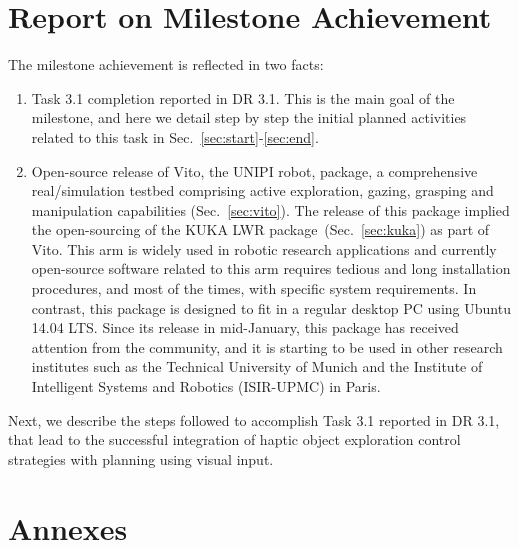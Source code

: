 \documentclass[a4paper,11pt,pdf]{pacmanreport}
\begin{document}
\section{Report on Milestone Achievement}

The milestone achievement is reflected in two facts:
\begin{enumerate}
	\item Task 3.1 completion reported in DR 3.1. This is the main goal of the milestone, and here we detail step by step the initial planned activities related to this task in Sec.~\ref{sec:start}-\ref{sec:end}.

	\item Open-source release of Vito, the UNIPI robot, package, a comprehensive real/simulation testbed comprising active exploration, gazing, grasping and manipulation capabilities (Sec.~\ref{sec:vito}). The release of this package implied the open-sourcing of the KUKA LWR package~(Sec.~\ref{sec:kuka}) as part of Vito. This arm is widely used in robotic research applications and currently open-source software related to this arm requires tedious and long installation procedures, and most of the times, with specific system requirements. In contrast, this package is designed to fit in a regular desktop PC using Ubuntu 14.04 LTS. Since its release in mid-January, this package has received attention from the community, and it is starting to be used in other research institutes such as the Technical University of Munich and the Institute of Intelligent Systems and Robotics (ISIR-UPMC) in Paris.
\end{enumerate}

Next, we describe the steps followed to accomplish Task 3.1 reported in DR 3.1, that lead to the successful integration of haptic object exploration control strategies with planning using visual input.



\newpage




\newpage
\appendix
\section{Annexes}

\end{document}

